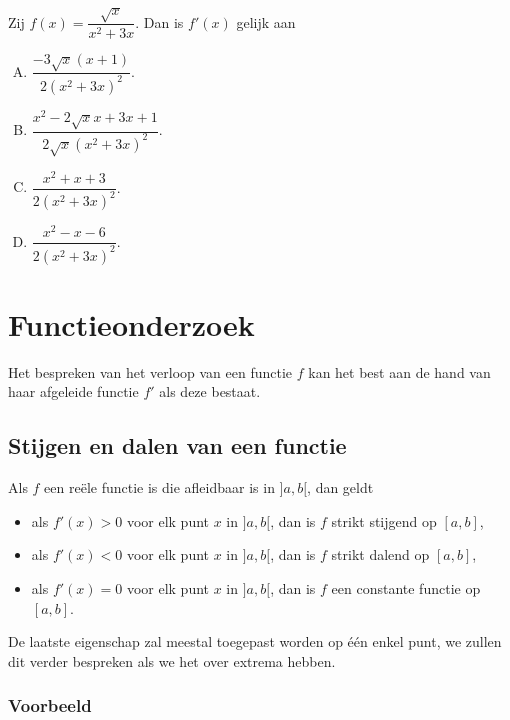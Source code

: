 \documentclass[a4paper,12pt,twoside]{article}
\newenvironment{eigenschap}{
  \begin{mdframed}[nobreak=true,frametitle={Eigenschap}]
  }{%
  \end{mdframed}
}
\begin{document}
\begin{oefening} %
Zij $\displaystyle f(x)=\dfrac{\sqrt{x}}{x^2+3x}$. Dan is $f'(x)$ gelijk aan
\begin{enumerate}[(A)]
  \itemsep1em
  \item $\displaystyle \dfrac{-3\sqrt{x}(x+1)}{2(x^2+3x)^2}$.
  \item $\displaystyle \dfrac{x^2-2\sqrt{x}x+3x+1}{2\sqrt{x}(x^2+3x)^2}$.
  \item $\displaystyle \dfrac{x^2+x+3}{2(x^2+3x)^2}$.
  \item $\displaystyle \dfrac{x^2-x-6}{2(x^2+3x)^2}$.
\end{enumerate}
\end{oefening}

\cleardoublepage
\section{Functieonderzoek}



Het bespreken van het verloop van een functie $f$ kan het best aan de hand van haar afgeleide functie $f'$ als deze bestaat.

\subsection{Stijgen en dalen van een functie}

\begin{eigenschap}
  Als $f$ een reële functie is die afleidbaar is in $]a,b[$, dan geldt
  \begin{itemize}
  \item als $f'(x)>0$ voor elk punt $x$ in $]a,b[$, dan is $f$ strikt stijgend op $[a,b]$,
  \item als $f'(x)<0$ voor elk punt $x$ in $]a,b[$, dan is $f$ strikt dalend op $[a,b]$,
  \item als $f'(x)=0$ voor elk punt $x$ in $]a,b[$, dan is $f$ een constante functie op $[a,b]$.
  \end{itemize}
\end{eigenschap}

De laatste eigenschap zal meestal toegepast worden op één enkel punt, we zullen dit verder bespreken als we het over extrema hebben.

\subsubsection*{Voorbeeld}
\end{document}
